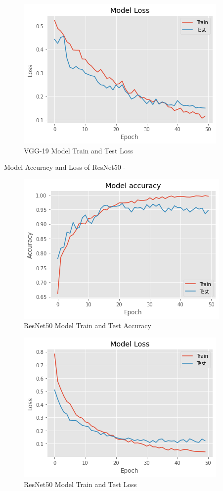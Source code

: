 \vspace{5mm}
\begin{figure}[hbt!]
\centering
\includegraphics[scale=1]{images/fig-28.png}
\caption{VGG-19 Model Train and Test Loss}
\label{fig:x VGG-19 Model Train and Test Loss}
\end{figure}

\newpage
\vspace{5mm}
\noindent Model Accuracy and Loss of ResNet50 -
\vspace{5mm}
\begin{figure}[hbt!]
\centering
\includegraphics[scale=1]{images/fig-29.png}
\caption{ResNet50 Model Train and Test Accuracy}
\label{fig:x ResNet50 Model Train and Test Accuracy}
\end{figure}

\vspace{5mm}
\begin{figure}[hbt!]
\centering
\includegraphics[scale=1]{images/fig-30.png}
\caption{ResNet50 Model Train and Test Loss}
\label{fig:x ResNet50 Model Train and Test Loss}
\end{figure}

